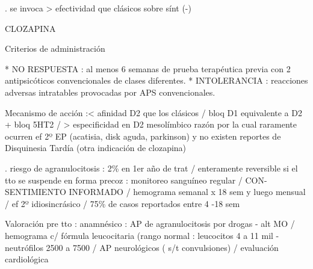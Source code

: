 . se invoca > efectividad que clásicos sobre sínt (-)

CLOZAPINA

Criterios de administración

* NO RESPUESTA : al menos 6 semanas de prueba terapéutica previa con 2 antipsicóticos convencionales de clases diferentes.
* INTOLERANCIA : reacciones adversas intratables provocadas por APS convencionales.

Mecanismo de acción :< afinidad D2 que los clásicos / bloq D1 equivalente a D2 + bloq 5HT2 / > especificidad en D2 mesolímbico razón por la cual raramente ocurren ef 2º EP (acatisia, disk aguda, parkinson) y no existen reportes de Disquinesia Tardía (otra indicación de clozapina)

. riesgo de agranulocitosis : 2\% en 1er año de trat / enteramente reversible si el tto se suspende en forma precoz : monitoreo sanguíneo regular / CON-SENTIMIENTO INFORMADO / hemograma semanal x 18 sem y luego mensual / ef 2º idiosincrásico / 75\% de casos reportados entre 4 -18 sem

Valoración pre tto : anamnésico : AP de agranulocitosis por drogas - alt MO / hemograma c/ fórmula leucocitaria (rango normal : leucocitos 4 a 11 mil - neutrófilos 2500 a 7500 / AP neurológicos ( s/t convulsiones) / evaluación cardiológica

